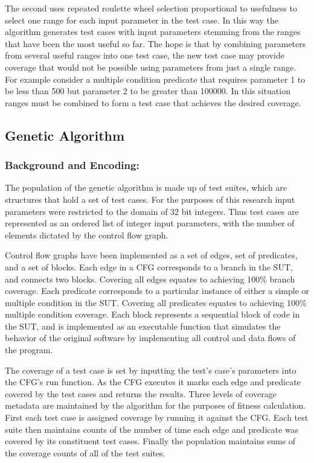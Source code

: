 \documentclass[runningheads]{llncs}
\begin{document}
The second uses repeated roulette wheel selection proportional to usefulness to select one range for each input parameter in the test case.  In this way the algorithm generates test cases with input parameters stemming from the ranges that have been the most useful so far. The hope is that by combining parameters from several useful ranges into one test case, the new test case may provide coverage that would not be possible using parameters from just a single range. For example consider a multiple condition predicate that requires parameter 1 to be less than 500 but parameter 2 to be greater than 100000. In this situation ranges must be combined to form a test case that achieves the desired coverage.

\subsection{Genetic Algorithm}

\subsubsection{Background and Encoding:}
The population of the genetic algorithm is made up of test suites, which are structures that hold a set of test cases. For the purposes of this research input parameters were restricted to the domain of 32 bit integers. Thus test cases are represented as an ordered list of integer input parameters, with the number of elements dictated by the control flow graph.

Control flow graphs have been implemented as a set of edges, set of predicates, and a set of blocks. Each edge in a CFG corresponds to a branch in the SUT, and connects two blocks. Covering all edges equates to achieving 100\% branch coverage. Each predicate corresponds to a particular instance of either a simple or multiple condition in the SUT. Covering all predicates equates to achieving 100\% multiple condition coverage. Each block represents a sequential block of code in the SUT, and is implemented as an executable function that simulates the behavior of the original software by implementing all control and data flows of the program. 

The coverage of a test case is set by inputting the test's case's parameters into the CFG's run function. As the CFG executes it marks each edge and predicate covered by the test cases and returns the results. Three levels of coverage metadata are maintained by the algorithm for the purposes of fitness calculation. First each test case is assigned coverage by running it against the CFG. Each test suite then maintains counts of the number of time each edge and predicate was covered by its constituent test cases. Finally the population maintains sums of the coverage counts of all of the test suites.
\end{document}
